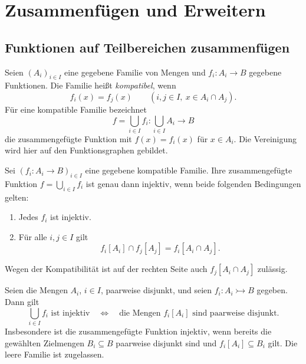 \chapter{Zusammenfügen und Erweitern}
\label{b06guide:ch:extensions}

\section{Funktionen auf Teilbereichen zusammenfügen}

\begin{definition}
Seien $(A_i)_{i\in I}$ eine gegebene Familie von Mengen und
$f_i\colon A_i\to B$ gegebene Funktionen. Die Familie heißt
\emph{kompatibel}, wenn
\[
 f_i(x)=f_j(x)\qquad
 (i,j\in I,\ x\in A_i\cap A_j).
\]
Für eine kompatible Familie bezeichnet
\[
 f=\bigcup_{i\in I}f_i\colon\bigcup_{i\in I}A_i\to B
\]
die zusammengefügte Funktion mit $f(x)=f_i(x)$ für $x\in A_i$.
Die Vereinigung wird hier auf den Funktionsgraphen gebildet.
\end{definition}

\begin{theorem}
\label{b06guide:thm:gluing}
Sei $(f_i\colon A_i\to B)_{i\in I}$ eine gegebene kompatible
Familie. Ihre zusammengefügte Funktion $f=\bigcup_{i\in I}f_i$
ist genau dann injektiv, wenn beide folgenden Bedingungen gelten:
\begin{enumerate}
\item Jedes $f_i$ ist injektiv.
\item Für alle $i,j\in I$ gilt
\[
 f_i[A_i]\cap f_j[A_j]=f_i[A_i\cap A_j].
\]
\end{enumerate}
Wegen der Kompatibilität ist auf der rechten Seite auch
$f_j[A_i\cap A_j]$ zulässig.
\end{theorem}

\begin{theorem}
\label{b06guide:thm:disjointgluing}
Seien die Mengen $A_i$, $i\in I$, paarweise disjunkt, und
seien $f_i\colon A_i\rightarrowtail B$ gegeben. Dann gilt
\[
 \bigcup_{i\in I}f_i\text{ ist injektiv}
 \quad\Longleftrightarrow\quad
 \text{die Mengen }f_i[A_i]\text{ sind paarweise disjunkt}.
\]
Insbesondere ist die zusammengefügte Funktion injektiv,
wenn bereits die gewählten Zielmengen $B_i\subseteq B$
paarweise disjunkt sind und $f_i[A_i]\subseteq B_i$ gilt.
Die leere Familie ist zugelassen.
\end{theorem}

